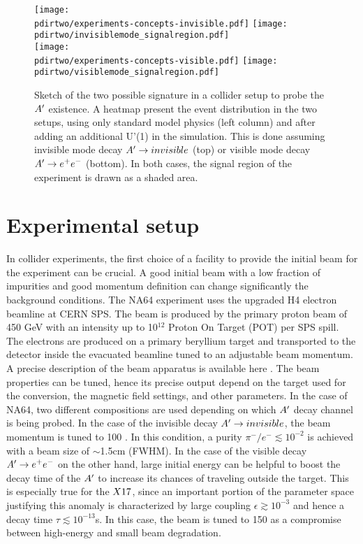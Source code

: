 \begin{figure}[bth!]
  \centering
  \texttt{[image: \\pdirtwo/experiments-concepts-invisible.pdf]}
  \texttt{[image: \\pdirtwo/invisiblemode\_signalregion.pdf]} \\
  \texttt{[image: \\pdirtwo/experiments-concepts-visible.pdf]}
  \texttt{[image: \\pdirtwo/visiblemode\_signalregion.pdf]}   
\caption[Sketch of experimental signatures for $\DM$]{Sketch of the two possible signature in a collider setup to probe the $\DM$ existence. A heatmap present the event distribution in the two setups, using only standard model physics (left column) and after adding an additional U'(1) in the simulation. This is done assuming invisible mode decay $A'\to invisible$ (top) or visible mode decay $A' \to e^+e^-$ (bottom). In both cases, the signal region of the experiment is drawn as a shaded area.}
\label{fig:two-signature}
\end{figure}

\clearpage
\newpage

\section{Experimental setup}
\label{ch2:sec:experimental-setup}

In collider experiments, the first choice of a facility to provide the initial beam for the experiment can be crucial. A good initial beam with a low fraction of impurities and good momentum definition can change significantly the background conditions. The NA64 experiment uses the upgraded H4 electron beamline at CERN SPS. The beam is produced by the primary proton beam of 450 \si{\giga\electronvolt} with an intensity up to 10$^{12}$ Proton On Target (POT) per SPS spill. The electrons are produced on a primary beryllium target and transported to the detector inside the evacuated beamline tuned to an adjustable beam momentum. A precise description of the beam apparatus is available here \cite{sps-beamline,h4-beamline}. The beam properties can be tuned, hence its precise output depend on the target used for the conversion, the magnetic field settings, and other parameters. In the case of NA64, two different compositions are used depending on which $\DM$ decay channel is being probed. In the case of the invisible decay $A'\to invisible$, the beam momentum is tuned to 100 \gev. In this condition, a purity $\pi^-/e^- \lesssim 10^{-2}$ is achieved with a beam size of $\sim$1.5\si{cm} (FWHM). In the case of the visible decay $A' \to e^+e^-$ on the other hand, large initial energy can be helpful to boost the decay time of the $\DM$ to increase its chances of traveling outside the target. This is especially true for the $X17$, since an important portion of the parameter space justifying this anomaly is characterized by large coupling $\epsilon \gtrsim 10^{-3}$ and hence a decay time $\tau \lesssim 10^{-13}$\si{s}. In this case, the beam is tuned to 150 \gev as a compromise between high-energy and small beam degradation.

